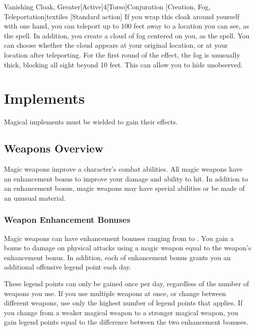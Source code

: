             \begin{magicitemdef}{Vanishing Cloak, Greater}[Active]{4}[Torso]{Conjuration [Creation, Fog, Teleportation]}{textiles}
                [Standard action] If you wrap this cloak around yourself with one hand, you can teleport up to 100 feet away to a location you can see, as the  spell.
                In addition, you create a cloud of fog centered on you, as the  spell.
                You can choose whether the cloud appears at your original location, or at your location after teleporting.
                For the first round of the effect, the fog is unusually thick, blocking all sight beyond 10 feet.
                This can allow you to hide unobserved.
            \end{magicitemdef}

    \section{Implements}
        Magical implements must be wielded to gain their effects.

        \subsection{Weapons Overview}

            Magic weapons improve a character's combat abilities.
            All magic weapons have an enhancement bonus to improve your damage and ability to hit.
            In addition to an enhancement bonus, magic weapons may have special abilities or be made of an unusual material.

            \subsubsection{Weapon Enhancement Bonuses}\label{Weapon Enhancement Bonuses}

                Magic weapons can have enhancement bonuses ranging from  to .
                You gain a bonus to damage on physical attacks using a magic weapon equal to the weapon's enhancement bonus.
                In addition, each  of enhancement bonus grants you an additional offensive legend point each day.

                These legend points can only be gained once per day, regardless of the number of weapons you use.
                If you use multiple weapons at once, or change between different weapons, use only the highest number of legend points that applies.
                If you change from a weaker magical weapon to a stronger magical weapon, you gain legend points equal to the difference between the two enhancement bonuses.


